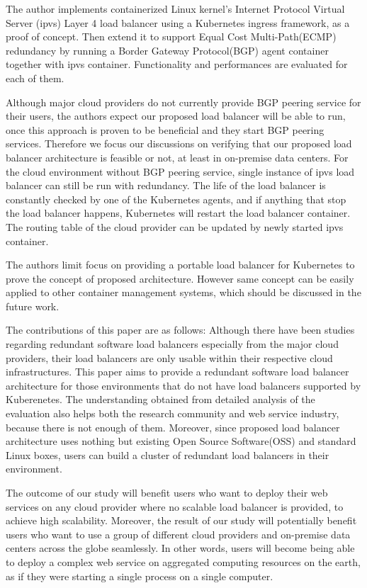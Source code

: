 The author implements containerized Linux kernel's Internet Protocol Virtual Server (ipvs)\cite{Zhang2000} Layer 4 load balancer using a Kubernetes ingress\cite{K8sIngress2017} framework, as a proof of concept.
Then extend it to support Equal Cost Multi-Path(ECMP)\cite{thaler2000multipath} redundancy by running a Border Gateway Protocol(BGP) agent container together with ipvs container.
Functionality and performances are evaluated for each of them.

Although major cloud providers do not currently provide BGP peering service for their users, the authors expect our proposed load balancer will be able to run, once this approach is proven to be beneficial and they start BGP peering services.
Therefore we focus our discussions on verifying that our proposed load balancer architecture is feasible or not, at least in on-premise data centers.
For the cloud environment without BGP peering service, single instance of ipvs load balancer can still be run with redundancy.
The life of the load balancer is constantly checked by one of the Kubernetes agents, and if anything that stop the load balancer happens, Kubernetes will restart the load balancer container.
The routing table of the cloud provider can be updated by newly started ipvs container.

The authors limit focus on  providing a portable load balancer for Kubernetes to prove the concept of proposed architecture.
However same concept can be easily applied to other container management systems, which should be discussed in the future work.

The contributions of this paper are as follows:
Although there have been studies regarding redundant software load balancers especially from the major cloud providers\cite{eisenbud2016maglev,patel2013ananta}, their load balancers are only usable within their respective cloud infrastructures.
This paper aims to provide a redundant software load balancer architecture for those environments that do not have load balancers supported by Kuberenetes.
The understanding obtained from detailed analysis of the evaluation also helps both the research community and web service industry, because there is not enough of them.
Moreover, since proposed load balancer architecture uses nothing but existing Open Source Software(OSS) and standard Linux boxes, users can build a cluster of redundant load balancers in their environment.

The outcome of our study will benefit users who want to deploy their web services on any cloud provider where no scalable load balancer is provided, to achieve high scalability.
Moreover, the result of our study will potentially benefit users who want to use a group of different cloud providers and on-premise data centers across the globe seamlessly.
In other words, users will become being able to deploy a complex web service on aggregated computing resources on the earth, as if they were starting a single process on a single computer.

